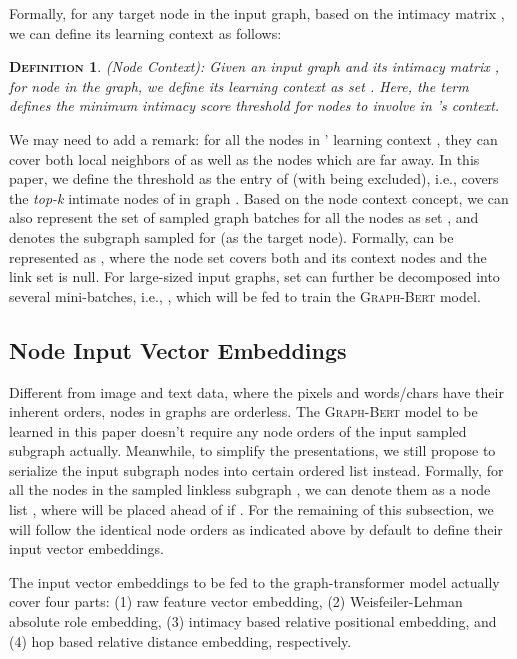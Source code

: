 \documentclass{article}
\newtheorem{definition}{\textsc{Definition}}
\newcommand{\our}{\textsc{Graph-Bert}}
\begin{document}
Formally, for any target node  in the input graph, based on the intimacy matrix , we can define its learning context as follows:
\begin{definition}
(Node Context): Given an input graph  and its intimacy matrix , for node  in the graph, we define its learning context as set . Here, the term  defines the minimum intimacy score threshold for nodes to involve in 's context. 
\end{definition}

We may need to add a remark: for all the nodes in ' learning context , they can cover both local neighbors of  as well as the nodes which are far away. In this paper, we define the threshold  as the  entry of  (with  being excluded), i.e.,  covers the \textit{top-k} intimate nodes of  in graph . Based on the node context concept, we can also represent the set of sampled graph batches for all the nodes as set , and  denotes the subgraph sampled for  (as the target node). Formally,  can be represented as , where the node set  covers both  and its context nodes and the link set is null. For large-sized input graphs, set  can further be decomposed into several mini-batches, i.e., , which will be fed to train the {\our} model. 





\subsection{Node Input Vector Embeddings}


Different from image and text data, where the pixels and words/chars have their inherent orders, nodes in graphs are orderless. The {\our} model to be learned in this paper doesn't require any node orders of the input sampled subgraph actually. Meanwhile, to simplify the presentations, we still propose to serialize the input subgraph nodes into certain ordered list instead. Formally, for all the nodes  in the sampled linkless subgraph , we can denote them as a node list , where  will be placed ahead of  if . For the remaining of this subsection, we will follow the identical node orders as indicated above by default to define their input vector embeddings.

The input vector embeddings to be fed to the graph-transformer model actually cover four parts: (1) raw feature vector embedding, (2) Weisfeiler-Lehman absolute role embedding, (3) intimacy based relative positional embedding, and (4) hop based relative distance embedding, respectively. 
\end{document}
